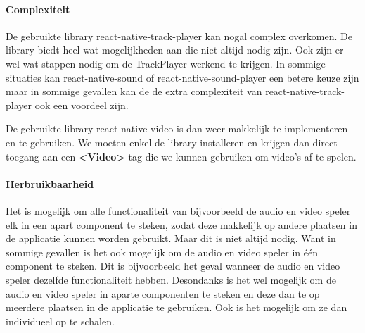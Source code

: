 \paragraph{Complexiteit}
De gebruikte library react-native-track-player kan nogal complex overkomen. De library 
biedt heel wat mogelijkheden aan die niet altijd nodig zijn. Ook zijn er wel wat stappen 
nodig om de TrackPlayer werkend te krijgen. In sommige situaties kan 
react-native-sound of react-native-sound-player een betere keuze zijn maar in sommige gevallen kan de 
de extra complexiteit van react-native-track-player ook een voordeel zijn. 

De gebruikte library react-native-video is dan weer makkelijk te implementeren en te gebruiken.
We moeten enkel de library installeren en krijgen dan direct toegang aan een \textbf{<Video>} tag
die we kunnen gebruiken om video's af te spelen.

\paragraph{Herbruikbaarheid}
Het is mogelijk om alle functionaliteit van bijvoorbeeld de audio en video speler elk in een 
apart component te steken, zodat deze makkelijk op andere plaatsen in de applicatie kunnen worden 
gebruikt. Maar dit is niet altijd
nodig. Want in sommige gevallen is het ook mogelijk om de audio en video speler in één component
te steken. Dit is bijvoorbeeld het geval wanneer de audio en video speler dezelfde functionaliteit
hebben. Desondanks is het wel mogelijk om de audio en video speler in aparte componenten te steken
en deze dan te op meerdere plaatsen in de applicatie te gebruiken. Ook is het mogelijk om ze dan 
individueel op te schalen.
